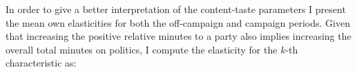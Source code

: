 \documentclass[12pt]{article}
\begin{document}
In order to give a better interpretation of the content-taste parameters I present the mean own elasticities for both the off-campaign and campaign periods.   Given that increasing the positive relative minutes to a party also implies increasing the overall total minutes on politics, I compute the elasticity for the $k$-th characteristic as: 




\end{document}
